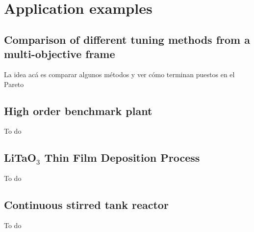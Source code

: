 \chapter{Application examples}
\label{chap:ApplicationExamples}
%
\section{Comparison of different tuning methods from a multi-objective frame}
La idea acá es comparar algunos métodos y ver cómo terminan puestos en el Pareto
%
\section{High order benchmark plant}
\label{sec:Bechmark}
To do
%
\section{LiTaO$_3$ Thin Film Deposition Process}
\label{sec:LiTAO3}
To do
%
\section{Continuous stirred tank reactor}
\label{sec:CSTR}
To do